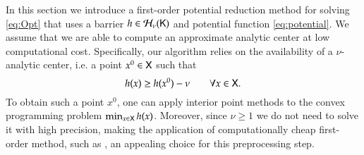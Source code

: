 
In this section we introduce a first-order potential reduction method for solving \eqref{eq:Opt} that uses a barrier $h \in\mathcal{H}_{\nu}(\mathsf{K})$ and potential function \eqref{eq:potential}. %
We assume that we are able to compute an approximate analytic center at low computational cost. Specifically, our algorithm relies on the availability of a $\nu$-analytic center, i.e. a point $x^{0}\in\mathsf{X}$ such that 
\begin{equation}\label{eq:analytic_center}
h(x)\geq h(x^{0})-\nu\qquad\forall x\in\mathsf{X}. 
\end{equation}
To obtain such a point $x^{0}$, one can apply interior point methods to the convex programming problem $\min_{x\in \mathsf{X}}h(x)$. Moreover, since $\nu \geq 1$ we do not need to solve it with high precision, making the application of computationally cheap first-order method, such as \cite{Dvurechensky:2022tu}, an appealing choice for this preprocessing step. 

